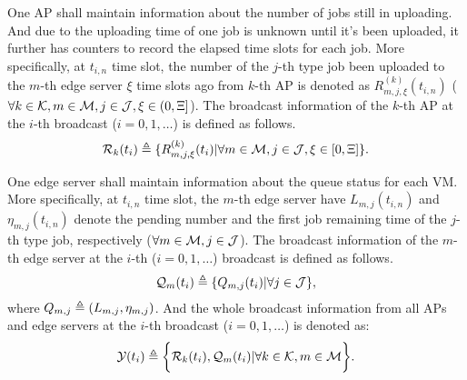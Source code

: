 One AP shall maintain information about the number of jobs still in uploading. 
And due to the uploading time of one job is unknown until it's been uploaded, it further has counters to record the elapsed time slots for each job.
More specifically, at $t_{i,n}$ time slot, the number of the $j$-th type job been uploaded to the $m$-th edge server $\xi$ time slots ago from $k$-th AP is denoted as $R^{(k)}_{m,j,\xi}(t_{i,n})$ ($\forall k\in\mathcal{K}, m\in\mathcal{M}, j\in\mathcal{J}, \xi\in(0,\Xi]$).
The broadcast information of the $k$-th AP at the $i$-th broadcast ($i=0,1,\dots$) is defined as follows.
\begin{align}
    \mathcal{R}_{k}(t_{i}) \triangleq \{R^{(k)}_{m,j,\xi}(t_{i}) | \forall m\in\mathcal{M}, j\in\mathcal{J}, \xi \in [0,\Xi]\}.
\end{align}

One edge server shall maintain information about the queue status for each VM.
More specifically, at $t_{i,n}$ time slot, the $m$-th edge server have $L_{m,j}(t_{i,n})$ and $\eta_{m,j}(t_{i,n})$ denote the pending number and the first job remaining time of the $j$-th type job, respectively ($\forall m\in\mathcal{M}, j\in\mathcal{J}$).
The broadcast information of the $m$-th edge server at the $i$-th ($i=0,1,\dots$) broadcast is defined as follows.
\begin{align}
    \mathcal{Q}_{m}(t_{i}) \triangleq \{Q_{m,j}(t_{i}) | \forall j\in\mathcal{J}\},
\end{align}
where $Q_{m,j} \triangleq (L_{m,j}, \eta_{m,j})$.
And the whole broadcast information from all APs and edge servers at the $i$-th broadcast ($i=0,1,\dots$) is denoted as:
\begin{align}
    \mathcal{Y}(t_{i}) \triangleq
        \bigg\{
            \mathcal{R}_{k}(t_{i}), \mathcal{Q}_{m}(t_{i}) | \forall k\in\mathcal{K}, m\in\mathcal{M}
        \bigg\}.
\end{align}

